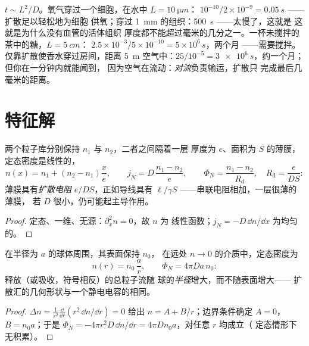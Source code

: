 \begin{example}[需要多长时间？]\label{ex:b2:particle-diffusion:times}
$t \sim L^2/D$。氧气穿过一个细胞，在水中 $L = \qty{10}{\micro m}$：
$10^{-10}/2 \times 10^{-9} = \qty{0.05}{s}$ ——扩散足以轻松地为细胞
供氧；穿过 \qty{1}{mm} 的组织：\qty{500}{s} ——太慢了，这就是
这就是为什么没有血管的活体组织
厚度都不能超过毫米的几分之一。一杯未搅拌的茶中的糖，$L = \qty{5}{cm}$：
$2.5 \times 10^{-3}/5 \times 10^{-10} = 5 \times 10^6\,\unit{s}$，两个月
——需要搅拌。仅靠扩散使香水穿过房间，距离 \qty{5}{m}
空气中：$25/10^{-5} = \qty{3e6}{s}$，约一个月；但你在一分钟内就能闻到，
因为空气在流动：\emph{对流}负责输运，扩散只
完成最后几毫米的距离。
\end{example}

\section{特征解}

\begin{proposition}[定态情形：薄膜]\label{prop:b2:particle-diffusion:membrane}
两个粒子库分别保持 $n_1$ 与 $n_2$，二者之间隔着一层
厚度为 $e$、面积为 $S$ 的薄膜，定态密度是线性的，
\[
n(x) = n_1 + (n_2 - n_1)\frac{x}{e}, \qquad
j_N = D\,\frac{n_1 - n_2}{e}, \qquad
\Phi_N = \frac{n_1 - n_2}{R_{\text{d}}}, \quad R_{\text{d}} = \frac{e}{DS}:
\]
薄膜具有\emph{扩散电阻} $e/DS$，正如导线具有
$\ell/\gamma S$ ——串联电阻相加，一层很薄的薄膜，
若 $D$ 很小，仍可能起主导作用。
\end{proposition}

\begin{proof}
定态、一维、无源：$\partial_x^2 n = 0$，故 $n$ 为
线性函数；$j_N = -D\,\dd n/\dd x$ 为均匀的。
\end{proof}

\begin{proposition}\label{prop:b2:particle-diffusion:sphere}
在半径为 $a$ 的球体周围，其表面保持 $n_0$，
在远处 $n \to 0$ 的介质中，定态密度为
\[
n(r) = n_0\,\frac{a}{r}, \qquad
\Phi_N = 4\pi D a\,n_0 :
\]
释放（或吸收，符号相反）的总粒子流随
球的\emph{半径}增大，而不随表面增大——
扩散汇的几何形状与一个静电电容的相同。
\end{proposition}

\begin{proof}
$\Delta n = \frac{1}{r^2}\frac{\dd}{\dd r}(r^2\,\dd n/\dd r) = 0$ 给出
$n = A + B/r$；边界条件确定 $A = 0$，$B = n_0 a$；于是
$\Phi_N = -4\pi r^2 D\,\dd n/\dd r = 4\pi D n_0 a$，对任意 $r$ 均成立（
定态情形下无积累）。
\end{proof}

